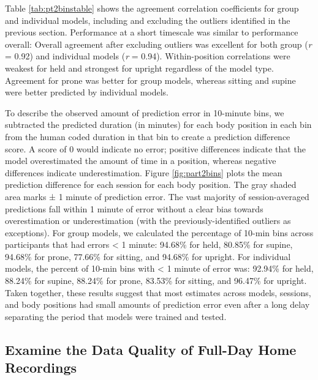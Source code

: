 \documentclass[
  man]{apa6}
\begin{document}
Table \ref{tab:pt2binstable} shows the agreement correlation coefficients for group and individual models, including and excluding the outliers identified in the previous section. Performance at a short timescale was similar to performance overall: Overall agreement after excluding outliers was excellent for both group (\emph{r} = 0.92) and individual models (\emph{r} = 0.94). Within-position correlations were weakest for held and strongest for upright regardless of the model type. Agreement for prone was better for group models, whereas sitting and supine were better predicted by individual models.

To describe the observed amount of prediction error in 10-minute bins, we subtracted the predicted duration (in minutes) for each body position in each bin from the human coded duration in that bin to create a prediction difference score. A score of 0 would indicate no error; positive differences indicate that the model overestimated the amount of time in a position, whereas negative differences indicate underestimation. Figure \ref{fig:part2bins} plots the mean prediction difference for each session for each body position. The gray shaded area marks ± 1 minute of prediction error. The vast majority of session-averaged predictions fall within 1 minute of error without a clear bias towards overestimation or underestimation (with the previously-identified outliers as exceptions). For group models, we calculated the percentage of 10-min bins across participants that had errors \textless{} 1 minute: 94.68\% for held, 80.85\% for supine, 94.68\% for prone, 77.66\% for sitting, and 94.68\% for upright. For individual models, the percent of 10-min bins with \textless{} 1 minute of error was: 92.94\% for held, 88.24\% for supine, 88.24\% for prone, 83.53\% for sitting, and 96.47\% for upright. Taken together, these results suggest that most estimates across models, sessions, and body positions had small amounts of prediction error even after a long delay separating the period that models were trained and tested.

\hypertarget{examine-the-data-quality-of-full-day-home-recordings}{%
\subsection{Examine the Data Quality of Full-Day Home Recordings}\label{examine-the-data-quality-of-full-day-home-recordings}}
\end{document}
